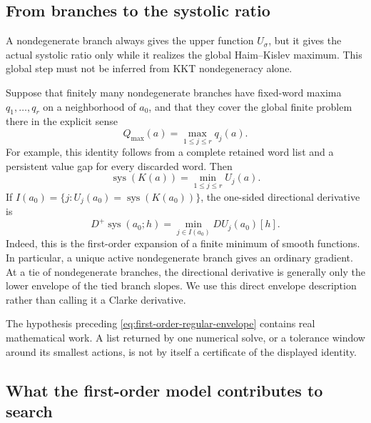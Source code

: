 \subsection{From branches to the systolic ratio}
\label{subsec:first-order-branch-envelope}

A nondegenerate branch always gives the upper function \(U_\sigma\), but it gives the
actual systolic ratio only while it realizes the global Haim--Kislev maximum.
This global step must not be inferred from KKT nondegeneracy alone.

Suppose that finitely many nondegenerate branches have fixed-word maxima
\(q_1,\ldots,q_r\) on a neighborhood of \(a_0\), and that they cover the
global finite problem there in the explicit sense
\[
  Q_{\max}(a)=\max_{1\leq j\leq r}q_j(a).
\]
For example, this identity follows from a complete retained word list and a
persistent value gap for every discarded word.  Then
\begin{equation}\label{eq:first-order-regular-envelope}
  \operatorname{sys}(K(a))=\min_{1\leq j\leq r}U_j(a).
\end{equation}
If \(I(a_0)=\{j:U_j(a_0)=\operatorname{sys}(K(a_0))\}\), the one-sided
directional derivative is
\begin{equation}\label{eq:first-order-envelope-derivative}
  D^+\operatorname{sys}(a_0;h)
  =\min_{j\in I(a_0)}DU_j(a_0)[h].
\end{equation}
Indeed, this is the first-order expansion of a finite minimum of smooth
functions.  In particular, a unique active nondegenerate branch gives an ordinary
gradient.  At a tie of nondegenerate branches, the directional derivative is generally only the
lower envelope of the tied branch slopes.  We use this direct envelope
description rather than calling it a Clarke derivative.

The hypothesis preceding \eqref{eq:first-order-regular-envelope} contains real
mathematical work.  A list returned by one numerical solve, or a tolerance
window around its smallest actions, is not by itself a certificate of the
displayed identity.

\subsection{What the first-order model contributes to search}
\label{subsec:first-order-search-model}

